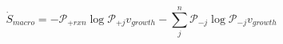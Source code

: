 \begin{equation}
\dot S_{macro} = -\mathcal P_{+rxn}\log\mathcal P_{+j}v_{growth} -\sum_j^n\mathcal P_{-j}\log\mathcal P_{-j} v_{growth}
\end{equation}